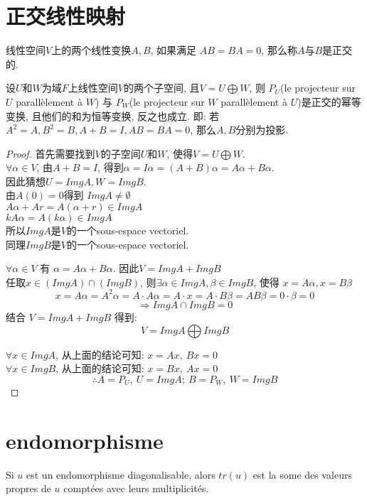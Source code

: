 \documentclass{book}
\begin{document}
\section{正交线性映射}
\begin{definition}
线性空间$V$上的两个线性变换$A, B$, 如果满足 $AB = BA = 0$, 那么称$A$与$B$是正交的.
\end{definition}

\begin{lemma}
设$U$和$W$为域$F$上线性空间$V$的两个子空间, 且$V = U \bigoplus W$, 则
$P_U$(le projecteur sur $U$ parall\`element \`a $W$) 与
$P_W$(le projecteur sur $W$ parall\`element \`a $U$)是正交的幂等变换, 且他们的和为恒等变换, 反之也成立.
即: 若$A^2 = A, B^2 = B, A + B = I, AB = BA = 0$, 那么$A, B$分别为投影.
\end{lemma}
\begin{proof}
首先需要找到$V$的子空间$U$和$W$, 使得$V = U \bigoplus W$. \\
$\forall \alpha \in V$, 由$A + B = I$, 得到$\alpha  = I \alpha = (A + B) \alpha = A \alpha + B \alpha$. \\
因此猜想$U = ImgA, W = ImgB$. \\
由$A(0) = 0$得到 $Img A \neq \emptyset$ \\
$A \alpha + A r = A(\alpha + r) \in Img A$ \\
$k A \alpha = A(k \alpha) \in Img A$ \\
所以$ImgA$是$V$的一个sous-espace vectoriel. \\
同理$ImgB$是$V$的一个sous-espace vectoriel.

$\forall \alpha \in V$ 有 $\alpha  = A \alpha + B \alpha$. 因此$V = Img A + Img B$ \\
任取$x \in (Img A) \cap (Img B)$, 则$\exists \alpha \in Img A, \beta \in Img B$, 使得 $x = A \alpha, x = B \beta$ \\
$$x = A \alpha = A^2 \alpha = A \cdot A \alpha = A \cdot x = A \cdot B \beta = AB \beta = 0 \cdot \beta = 0 $$
$$\Rightarrow Img A \cap Img B = 0$$
结合 $V = Img A + Img B$ 得到:
$$V = Img A \bigoplus Img B$$

$\forall x \in Img A$, 从上面的结论可知: $x = A x,~ B x = 0$ \\
$\forall x \in Img B$, 从上面的结论可知: $x = B x,~ A x = 0$ \\
$$\therefore A = P_U,~ U = Img A;~ B = P_W,~ W = Img B$$
\end{proof}

\section{endomorphisme}
Si $u$ est un endomorphisme diagonalisable, alors $tr(u)$ est la some des valeurs propres de $u$ compt\'ees avec leurs multiplicit\'es.
\end{document}
